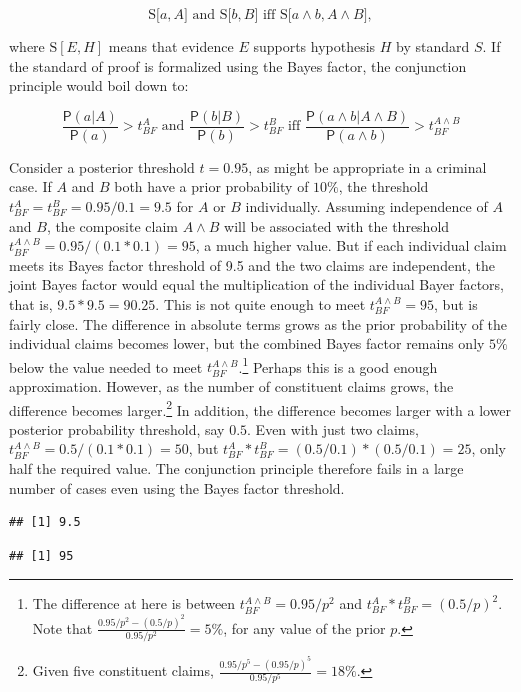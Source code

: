\documentclass[10pt,dvipsnames,enabledeprecatedfontcommands]{scrartcl}
\newcommand{\et}{\wedge}
\newcommand{\pr}[1]{\mathsf{P}(#1)}
\begin{document}
\[\text{S[$a, A$] and S[$b, B$] iff S[$a \wedge b, A\wedge B$]},\]

\noindent where \(\text{S}[E, H]\) means that evidence \(E\) supports
hypothesis \(H\) by standard \(S\). If the standard of proof is
formalized using the Bayes factor, the conjunction principle would boil
down to:

\[  \text{ $\frac{\pr{a | A }}{\pr{a}}>t^A_{BF}$ and $\frac{\pr{ b | B}}{\pr{b}}>t^B_{BF}$ iff $\frac{\pr{a \et b | A \et B}}{\pr{a \et b}}>t^{A\wedge B}_{BF}$ } \]

\noindent Consider a posterior threshold \(t=0.95\), as might be
appropriate in a criminal case. If \(A\) and \(B\) both have a prior
probability of \(10\%\), the threshold
\(t^A_{BF}=t_{BF}^B=0.95/0.1=9.5\) for \(A\) or \(B\) individually.
Assuming independence of \(A\) and \(B\), the composite claim
\(A \wedge B\) will be associated with the threshold
\(t^{A\wedge B}_{BF}=0.95/(0.1*0.1)=95\), a much higher value. But if
each individual claim meets its Bayes factor threshold of 9.5 and the
two claims are independent, the joint Bayes factor would equal the
multiplication of the individual Bayer factors, that is,
\(9.5*9.5=90.25\). This is not quite enough to meet
\(t^{A\wedge B}_{BF}=95\), but is fairly close. The difference in
absolute terms grows as the prior probability of the individual claims
becomes lower, but the combined Bayes factor remains only \(5\%\) below
the value needed to meet
\(t_{BF}^{A\wedge B}\).\footnote{The difference at here is between $t_{BF}^{A\wedge B}=0.95/p^2$ and $t_{BF}^{A}*t_{BF}^{B}=(0.5/p)^{2}$. Note that $\frac{0.95/p^2 - (0.5/p)^{2}}{0.95/p^2}=5\%$, for any value of the prior $p$.}
Perhaps this is a good enough approximation. However, as the number of
constituent claims grows, the difference becomes
larger.\footnote{Given five constituent claims, $\frac{0.95/p^5 - (0.95/p)^{5}}{0.95/p^5}=18\%$.}
In addition, the difference becomes larger with a lower posterior
probability threshold, say \(0.5\). Even with just two claims,
\(t^{A\wedge B}_{BF}=0.5/(0.1*0.1)=50\), but
\(t^A_{BF}*t_{BF}^B=(0.5/0.1)*(0.5/0.1)=25\), only half the required
value. The conjunction principle therefore fails in a large number of
cases even using the Bayes factor threshold.

\begin{verbatim}
## [1] 9.5
\end{verbatim}

\begin{verbatim}
## [1] 95
\end{verbatim}
\end{document}
